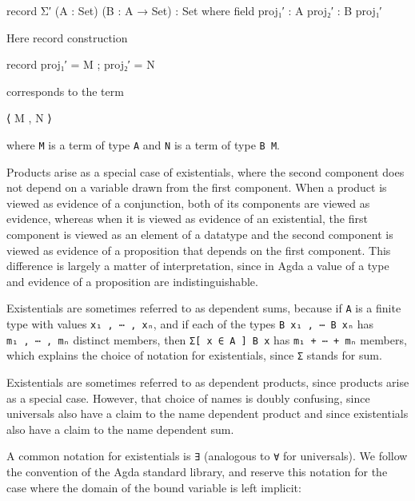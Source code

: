 \begin{fence}
\begin{code}
record Σ′ (A : Set) (B : A → Set) : Set where
  field
    proj₁′ : A
    proj₂′ : B proj₁′
\end{code}
\end{fence}

Here record construction

\begin{myDisplay}
record
  { proj₁′ = M
  ; proj₂′ = N
  }
\end{myDisplay}

corresponds to the term

\begin{myDisplay}
⟨ M , N ⟩
\end{myDisplay}

where \texttt{M} is a term of type \texttt{A} and \texttt{N} is a term
of type \texttt{B\ M}.

Products arise as a special case of existentials, where the second
component does not depend on a variable drawn from the first component.
When a product is viewed as evidence of a conjunction, both of its
components are viewed as evidence, whereas when it is viewed as evidence
of an existential, the first component is viewed as an element of a
datatype and the second component is viewed as evidence of a proposition
that depends on the first component. This difference is largely a matter
of interpretation, since in Agda a value of a type and evidence of a
proposition are indistinguishable.

Existentials are sometimes referred to as dependent sums, because if
\texttt{A} is a finite type with values \texttt{x₁\ ,\ ⋯\ ,\ xₙ}, and if
each of the types \texttt{B\ x₁\ ,\ ⋯\ B\ xₙ} has
\texttt{m₁\ ,\ ⋯\ ,\ mₙ} distinct members, then
\texttt{Σ{[}\ x\ ∈\ A\ {]}\ B\ x} has \texttt{m₁\ +\ ⋯\ +\ mₙ} members,
which explains the choice of notation for existentials, since \texttt{Σ}
stands for sum.

Existentials are sometimes referred to as dependent products, since
products arise as a special case. However, that choice of names is
doubly confusing, since universals also have a claim to the name
dependent product and since existentials also have a claim to the name
dependent sum.

A common notation for existentials is \texttt{∃} (analogous to
\texttt{∀} for universals). We follow the convention of the Agda
standard library, and reserve this notation for the case where the
domain of the bound variable is left implicit:

